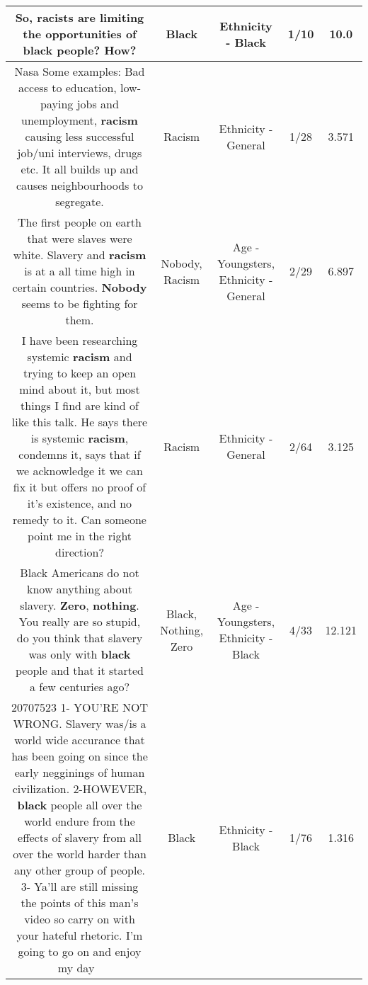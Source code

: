 \documentclass[11pt]{article}
\newlength\mylength
\begin{document}
\begin{center}
\begin{longtable}{|C{.65\mylength}|C{.30\mylength}|C{.12\mylength}|C{.12\mylength}|C{.12\mylength}|}
  \small So, racists are limiting the opportunities of \textbf{black} people? How?\normalsize   & Black & Ethnicity - Black & 1/10 & 10.0 \\  \hline
  \small Nasa Some examples: Bad access to education, low-paying jobs and unemployment, \textbf{racism} causing less successful job/uni interviews, drugs etc. It all builds up and causes neighbourhoods to segregate.\normalsize   & Racism & Ethnicity - General & 1/28 & 3.571 \\  \hline
  \small The first people on earth that were slaves were white. Slavery and \textbf{racism} is at a all time high in certain countries. \textbf{Nobody} seems to be fighting for them.\normalsize   & Nobody, Racism & Age - Youngsters, Ethnicity - General & 2/29 & 6.897 \\  \hline
  \small I have been researching systemic \textbf{racism} and trying to keep an open mind about it, but most things I find are kind of like this talk. He says there is systemic \textbf{racism}, condemns it, says that if we acknowledge it we can fix it but offers no proof of it's existence, and no remedy to it. Can someone point me in the right direction?\normalsize   & Racism & Ethnicity - General & 2/64 & 3.125 \\  \hline
  \small Black Americans do not know anything about slavery. \textbf{Zero}, \textbf{nothing}. You really are so stupid, do you think that slavery was only with \textbf{black} people and that it started a few centuries ago?\normalsize   & Black, Nothing, Zero & Age - Youngsters, Ethnicity - Black & 4/33 & 12.121 \\  \hline
  \small 20707523 1- YOU'RE NOT WRONG. Slavery was/is a world wide accurance that has been going on since the early negginings of human civilization. 2-HOWEVER, \textbf{black} people all over the world endure from the effects of slavery from all over the world harder than any other group of people. 3- Ya'll are still missing the points of this man's video so carry on with your hateful rhetoric. I'm going to go on and enjoy my day 💜\normalsize   & Black & Ethnicity - Black & 1/76 & 1.316 \\  \hline

\end{longtable}
\end{center}
\end{document}
